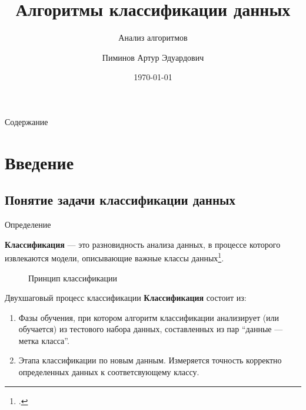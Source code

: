 \documentclass{beamer}
\title %
{Алгоритмы классификации данных}
\subtitle
{Анализ алгоритмов} %
\author[Пиминов А.Э.] %
{Пиминов Артур Эдуардович}
\institute[НГУ] %
{
  Группа 23224\\
  Факультет информационных технологий\\
  Новосибирский государственный университет
}
\date[\today] %
{\today}
\begin{document}
\begin{frame}
  \titlepage
\end{frame}

\begin{frame}{Содержание}
  \tableofcontents
\end{frame}




\section{Введение}

\subsection{Понятие задачи классификации данных}

\begin{frame}{Определение}
  \begin{definition} 
    \textbf{Классификация} — это разновидность анализа данных, в процессе которого извлекаются модели, описывающие важные классы данных\footcite{Jiawei2012}.  
  \end{definition}
  \vfill
  \begin{figure}
    \caption{Принцип классификации}
  \end{figure}
\end{frame}

\begin{frame}{Двухшаговый процесс классификации}
  \textbf{Классификация} состоит из:
  \begin{enumerate}
    \item Фазы обучения, при котором алгоритм классификации анализирует (или обучается) из тестового набора данных, составленных из пар ``данные — метка класса''.
      \pause
    \item Этапа классификации по новым данным. Измеряется точность корректно определенных данных к соответсвующему классу.
  \end{enumerate}
\end{frame}
\end{document}
